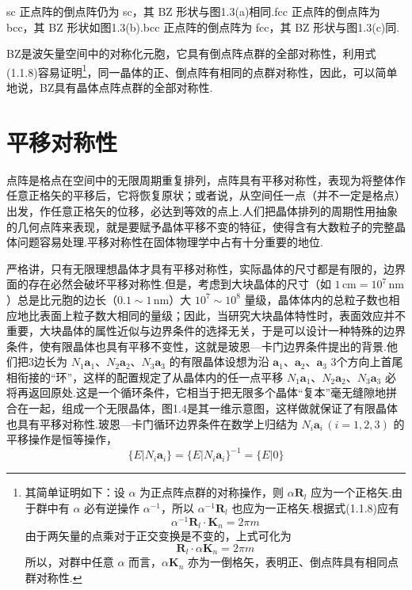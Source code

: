 sc 正点阵的倒点阵仍为 sc，其 BZ 形状与图1.3(a)相同.fcc 正点阵的倒点阵为 bcc，其 BZ 形状如图1.3(b).bcc 正点阵的倒点阵为 fcc，其 BZ 形状与图1.3(c)同.

BZ是波矢量空间中的对称化元胞，它具有倒点阵点群的全部对称性，利用式(1.1.8)容易证明\footnote{其简单证明如下：设 $\alpha$ 为正点阵点群的对称操作，则 $\alpha\boldsymbol{R}_l$ 应为一个正格矢.由于群中有 $\alpha$ 必有逆操作 $\alpha^{-1}$，所以 $\alpha^{-1}\boldsymbol{R}_l$ 也应为一正格矢.根据式(1.1.8)应有
\begin{equation}
  \alpha^{-1}\boldsymbol{R}_l\cdot\boldsymbol{K}_n=2\pi m
\end{equation}
由于两矢量的点乘对于正交变换是不变的，上式可化为
\begin{equation}
  \boldsymbol{R}_l\cdot\alpha\boldsymbol{K}_n=2\pi m
\end{equation}
所以，对群中任意 $\alpha$ 而言，$\alpha\boldsymbol{K}_n$ 亦为一倒格矢，表明正、倒点阵具有相同点群对称性.}，同一晶体的正、倒点阵有相同的点群对称性，因此，可以简单地说，BZ具有晶体点阵点群的全部对称性.

\section{平移对称性}

点阵是格点在空间中的无限周期重复排列，点阵具有平移对称性，表现为将整体作任意正格矢的平移后，它将恢复原状；或者说，从空间任一点（并不一定是格点）出发，作任意正格矢的位移，必达到等效的点上.人们把晶体排列的周期性用抽象的几何点阵来表现，就是要赋予晶体平移不变的特征，使得含有大数粒子的完整晶体问题容易处理.平移对称性在固体物理学中占有十分重要的地位.

严格讲，只有无限理想晶体才具有平移对称性，实际晶体的尺寸都是有限的，边界面的存在必然会破坏平移对称性.但是，考虑到大块晶体的尺寸（如 $1\,\mathrm{cm}=10^{7}\,\mathrm{nm}$）总是比元胞的边长（$0.1\sim1\,\mathrm{nm}$）大 $10^{7}\sim10^{8}$ 量级，晶体体内的总粒子数也相应地比表面上粒子数大相同的量级；因此，当研究大块晶体特性时，表面效应并不重要，大块晶体的属性近似与边界条件的选择无关，于是可以设计一种特殊的边界条件，使有限晶体也具有平移不变性，这就是玻恩—卡门边界条件提出的背景.他们把3边长为 $N_1\boldsymbol{a}_1$、$N_2\boldsymbol{a}_2$、$N_3\boldsymbol{a}_3$ 的有限晶体设想为沿 $\boldsymbol{a}_1$、$\boldsymbol{a}_2$、$\boldsymbol{a}_3$ 3个方向上首尾相衔接的“环”，这样的配置规定了从晶体内的任一点平移 $N_1\boldsymbol{a}_1$、$N_2\boldsymbol{a}_2$、$N_3\boldsymbol{a}_3$ 必将再返回原处.这是一个循环条件，它相当于把无限多个晶体“复本”毫无缝隙地拼合在一起，组成一个无限晶体，图1.4是其一维示意图，这样做就保证了有限晶体也具有平移对称性.玻恩—卡门循环边界条件在数学上归结为 $N_i\boldsymbol{a}_i\,(i=1,2,3)$ 的平移操作是恒等操作，
\begin{equation}
  \{E|N_i\boldsymbol{a}_i\}=\{E|N_i\boldsymbol{a}_i\}^{-1}=\{E|0\}
\end{equation}

